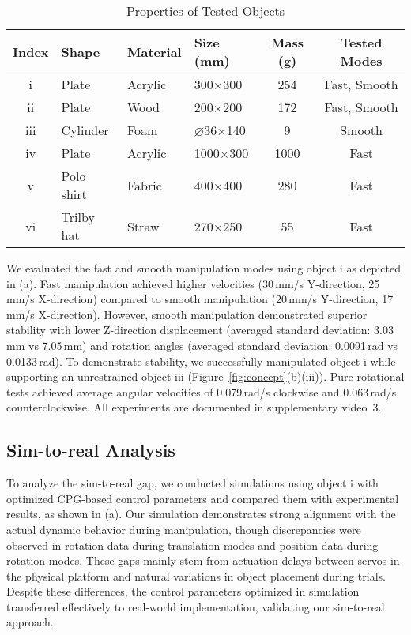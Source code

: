 \begin{table}[t]
\centering
\caption{Properties of Tested Objects}
\renewcommand{\arraystretch}{1.2}
\setlength{\tabcolsep}{4pt}
\begin{tabular}{c l l l c c}
\hline
\textbf{Index} & \textbf{Shape} & \textbf{Material} & \textbf{Size (mm)} & \textbf{Mass (g)} & \textbf{Tested Modes} \\
\hline
i   & Plate      & Acrylic  & 300$\times$300 & 254  & Fast, Smooth \\
ii  & Plate      & Wood  & 200$\times$200 & 172  & Fast, Smooth \\
iii & Cylinder   & Foam     & $\diameter$36$\times$140 & 9  & Smooth \\
iv  & Plate      & Acrylic  & 1000$\times$300 & 1000 & Fast \\
v   & Polo shirt & Fabric   & 400$\times$400 & 280  & Fast \\
vi  & Trilby hat & Straw   & 270$\times$250 & 55  & Fast \\
\hline
\end{tabular}
\label{tab:exp}
\end{table}

We evaluated the fast and smooth manipulation modes using object i as depicted in (a). Fast manipulation achieved higher velocities (30\,mm/s Y-direction, 25\,mm/s X-direction) compared to smooth manipulation (20\,mm/s Y-direction, 17\,mm/s X-direction). However, smooth manipulation demonstrated superior stability with lower Z-direction displacement (averaged standard deviation: 3.03\,mm vs 7.05\,mm) and rotation angles (averaged standard deviation: 0.0091\,rad vs 0.0133\,rad). To demonstrate stability, we successfully manipulated object i while supporting an unrestrained object iii (Figure~\ref{fig:concept}(b)(iii)). Pure rotational tests achieved average angular velocities of 0.079\,rad/s clockwise and 0.063\,rad/s counterclockwise. All experiments are documented in supplementary video~3.

\subsection{Sim-to-real Analysis}
\label{sec:sim_real}
To analyze the sim-to-real gap, we conducted simulations using object i with optimized CPG-based control parameters and compared them with experimental results, as shown in (a). Our simulation demonstrates strong alignment with the actual dynamic behavior during manipulation, though discrepancies were observed in rotation data during translation modes and position data during rotation modes. These gaps mainly stem from actuation delays between servos in the physical platform and natural variations in object placement during trials. Despite these differences, the control parameters optimized in simulation transferred effectively to real-world implementation, validating our sim-to-real approach.


